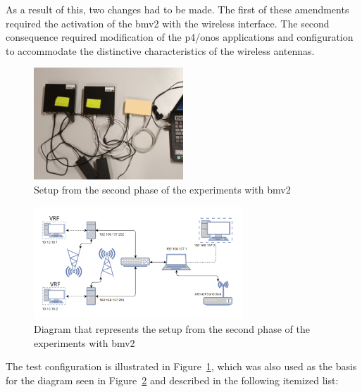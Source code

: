 As a result of this, two changes had to be made. The first of these amendments required the activation of the \gls{bmv2} with the wireless interface. The second consequence required modification of the \gls{p4}/\gls{onos} applications and configuration to accommodate the distinctive characteristics of the wireless antennas.

\begin{figure}
	\centering
	\includegraphics[width=0.5\textwidth]{Chapters/Figures/tests/bmv2_phase_2/20241122_193213.jpg}
	\caption{Setup from the second phase of the experiments with \gls{bmv2}}
	\label{fig:exp2_phase2_setup}
\end{figure}

\begin{figure}
	\centering
	\includegraphics[width=0.7\textwidth]{Chapters/Figures/tests/bmv2_phase_2/setup_diagram.PNG}
	\caption{Diagram that represents the setup from the second phase of the experiments with \gls{bmv2}}
	\label{fig:exp2_phase2_diagram}
\end{figure}


The test configuration is illustrated in Figure~\ref{fig:exp2_phase2_setup}, which was also used as the basis for the diagram seen in Figure~\ref{fig:exp2_phase2_diagram} and described in the following itemized list:


